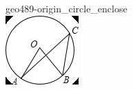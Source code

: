 \documentclass[12pt]{article}
\begin{document}
\begin{center}
\begin{minipage}{0.32\textwidth}
\end{minipage}
\hfill\begin{minipage}{0.32\textwidth}\centering
geo489-origin\_circle\_enclose\\
\includegraphics[width=0.95\linewidth]{out_rommath_origin/items/geo489-origin/assets/figure_circle.png}
\end{minipage}
\par
\end{center}
\bigskip
\end{document}
